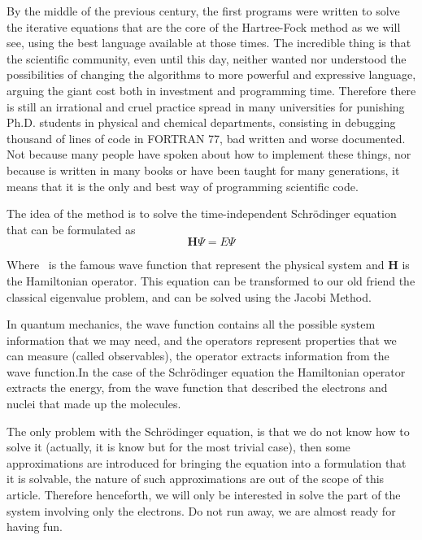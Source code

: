 \documentclass{tmr}
\begin{document}
 
\par By the middle of the previous century, the first programs were written to solve the 
iterative equations that are the core of the Hartree-Fock method as we will see, using
the best language available at those times. The incredible thing is that the scientific community, even until
this day, neither wanted nor understood the possibilities of changing the algorithms to 
more powerful and expressive language, arguing the giant cost both in investment and programming time. Therefore 
there is still an irrational and cruel practice spread in many universities for punishing Ph.D. students
in physical and chemical departments, consisting in debugging thousand of lines of code in FORTRAN 77,
bad written and worse documented. Not because many people have spoken about how to implement
these things, nor because is written in many books or have been taught 
for many generations, it means that it is the only and best way of programming scientific code.

\par The idea of the method is to solve the time-independent Schr\"{o}dinger
 equation that can be formulated as
\[ \mathbf{H}\Psi = E\Psi \]

Where \textPsi\ is the famous wave function that represent the physical
system and \textbf{H} is the Hamiltonian operator. This equation can be
transformed to our old friend the classical eigenvalue problem, and can
be solved using the Jacobi Method.

\par In quantum mechanics, the wave function contains all the possible system information that 
we may need, and the operators represent properties that we can measure (called observables),
the operator extracts information from the wave function.In the case of the Schr\"odinger 
equation the Hamiltonian operator extracts the energy, from the wave function that described
the electrons and nuclei that made up the molecules.

\par The only problem with the Schr\"odinger equation, is that we do not know how to solve it 
(actually, it is know but for the most trivial case),
then some approximations are introduced for bringing the equation into 
a formulation that it is solvable, the nature of such approximations are out of the scope of this article.
Therefore henceforth, we will only be interested in solve the part of the system involving
only the electrons. Do not run away, we are almost ready for having fun.
\end{document}
